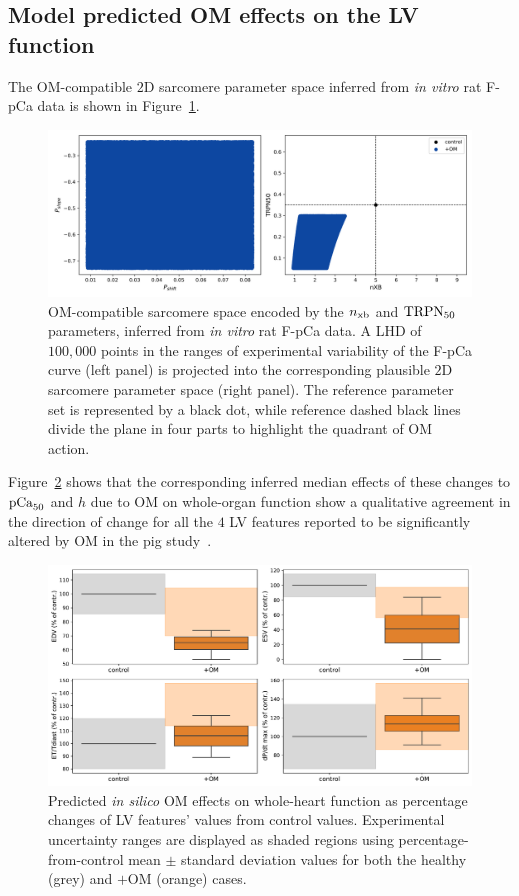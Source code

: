 %
%
%
\subsection{Model predicted OM effects on the LV function}
The OM-compatible $2$D sarcomere parameter space inferred from \textit{in vitro} rat F-pCa data is shown in Figure~\ref{fig:deltas}.

\begin{figure}[!ht]
    \myfloatalign
    \includegraphics[width=\textwidth]{figures/chapter05/Deltas_and_params_with_OM_blue.png}
    \caption{OM-compatible sarcomere space encoded by the $n_{\textrm{xb}}$ and $\textrm{TRPN}_{50}$ parameters, inferred from \textit{in vitro} rat F-pCa data. A LHD of $100,000$ points in the ranges of experimental variability of the F-pCa curve (left panel) is projected into the corresponding plausible $2$D sarcomere parameter space (right panel). The reference parameter set is represented by a black dot, while reference dashed black lines divide the plane in four parts to highlight the quadrant of OM action.}
    \label{fig:deltas}
\end{figure}

\vspace{0.2cm}
Figure~\ref{fig:lvfeatsdistr} shows that the corresponding inferred median effects of these changes to $\textrm{pCa}_{50}$ and $h$ due to OM on whole-organ function show a qualitative agreement in the direction of change for all the $4$ LV features reported to be significantly altered by OM in the pig study~\cite{Bakkehaug:2015}.

\begin{figure}[!ht]
    \myfloatalign
    \includegraphics[width=\textwidth]{figures/chapter05/Fig3.pdf}
    \caption{Predicted \textit{in silico} OM effects on whole-heart function as percentage changes of LV features' values from control values. Experimental uncertainty ranges are displayed as shaded regions using percentage-from-control mean $\pm$ standard deviation values for both the healthy (grey) and $+$OM (orange) cases.}
    \label{fig:lvfeatsdistr}
\end{figure}


